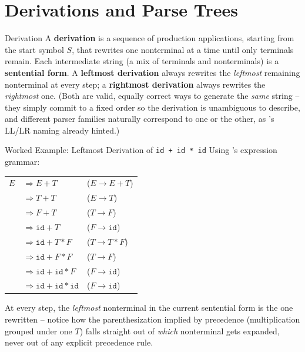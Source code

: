 \documentclass[full-course-notes.tex]{subfiles}
\begin{document}
\section{Derivations and Parse Trees}
\label{sec:l8-derivations}

\begin{defbox}{Derivation}
A \textbf{derivation} is a sequence of production applications, starting from the start symbol
$S$, that rewrites one nonterminal at a time until only terminals remain. Each intermediate
string (a mix of terminals and nonterminals) is a \textbf{sentential form}. A
\textbf{leftmost derivation} always rewrites the \emph{leftmost} remaining nonterminal at every
step; a \textbf{rightmost derivation} always rewrites the \emph{rightmost} one. (Both are valid,
equally correct ways to generate the \emph{same} string -- they simply commit to a fixed order
so the derivation is unambiguous to describe, and different parser families naturally correspond
to one or the other, as 's LL/LR naming already hinted.)
\end{defbox}

\begin{examplebox}{Worked Example: Leftmost Derivation of \texttt{id + id * id}}
Using 's expression grammar:
\begin{center}
\renewcommand{\arraystretch}{1.25}
\small
\begin{tabular}{@{}lll@{}}
$E$ & $\Rightarrow E + T$ & ($E \to E + T$) \\
& $\Rightarrow T + T$ & ($E \to T$) \\
& $\Rightarrow F + T$ & ($T \to F$) \\
& $\Rightarrow \texttt{id} + T$ & ($F \to \texttt{id}$) \\
& $\Rightarrow \texttt{id} + T * F$ & ($T \to T * F$) \\
& $\Rightarrow \texttt{id} + F * F$ & ($T \to F$) \\
& $\Rightarrow \texttt{id} + \texttt{id} * F$ & ($F \to \texttt{id}$) \\
& $\Rightarrow \texttt{id} + \texttt{id} * \texttt{id}$ & ($F \to \texttt{id}$) \\
\end{tabular}
\end{center}
At every step, the \emph{leftmost} nonterminal in the current sentential form is the one
rewritten -- notice how the parenthesization implied by precedence (multiplication grouped
under one $T$) falls straight out of \emph{which} nonterminal gets expanded, never out of any
explicit precedence rule.
\end{examplebox}
\end{document}
